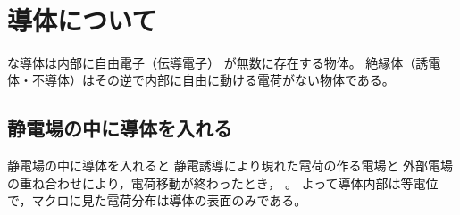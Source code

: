   ﻿\section{導体について}

  な導体は内部に自由電子（伝導電子）
  が無数に存在する物体。
  絶縁体（誘電体・不導体）はその逆で内部に自由に動ける電荷がない物体である。

  \subsection{静電場の中に導体を入れる}

  静電場の中に導体を入れると
  静電誘導により現れた電荷の作る電場と
  外部電場の重ね合わせにより，電荷移動が終わったとき，
  。
  よって導体内部は等電位で，マクロに見た電荷分布は導体の表面のみである。
